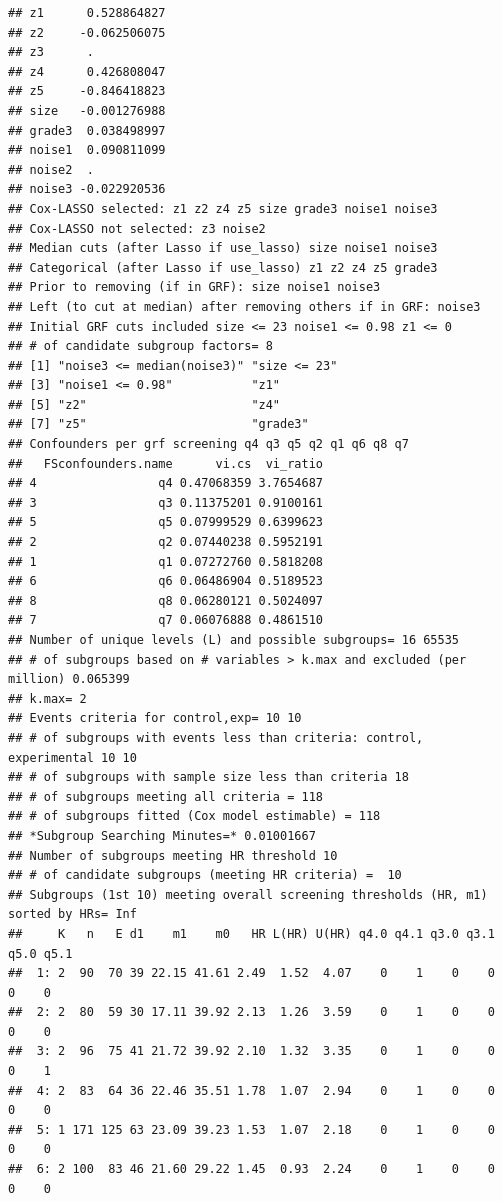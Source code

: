 \documentclass[smallextended]{svjour3}
\makeatletter
\newenvironment{kframe}{%
 \def\at@end@of@kframe{}%
 \ifinner\ifhmode%
  \def\at@end@of@kframe{\end{minipage}}%
  \begin{minipage}{\columnwidth}%
 \fi\fi%
 \def\FrameCommand##1{\hskip\@totalleftmargin \hskip-\fboxsep
 \colorbox{shadecolor}{##1}\hskip-\fboxsep
     \hskip-\linewidth \hskip-\@totalleftmargin \hskip\columnwidth}%
 \MakeFramed {\advance\hsize-\width
   \@totalleftmargin\z@ \linewidth\hsize
   \@setminipage}}%
 {\par\unskip\endMakeFramed%
 \at@end@of@kframe}
\newenvironment{knitrout}{}{} %
\makeatother
\begin{document}
\begin{knitrout}
\begin{kframe}
\begin{verbatim}
## z1      0.528864827
## z2     -0.062506075
## z3      .          
## z4      0.426808047
## z5     -0.846418823
## size   -0.001276988
## grade3  0.038498997
## noise1  0.090811099
## noise2  .          
## noise3 -0.022920536
## Cox-LASSO selected: z1 z2 z4 z5 size grade3 noise1 noise3 
## Cox-LASSO not selected: z3 noise2 
## Median cuts (after Lasso if use_lasso) size noise1 noise3 
## Categorical (after Lasso if use_lasso) z1 z2 z4 z5 grade3 
## Prior to removing (if in GRF): size noise1 noise3 
## Left (to cut at median) after removing others if in GRF: noise3 
## Initial GRF cuts included size <= 23 noise1 <= 0.98 z1 <= 0 
## # of candidate subgroup factors= 8 
## [1] "noise3 <= median(noise3)" "size <= 23"              
## [3] "noise1 <= 0.98"           "z1"                      
## [5] "z2"                       "z4"                      
## [7] "z5"                       "grade3"                  
## Confounders per grf screening q4 q3 q5 q2 q1 q6 q8 q7 
##   FSconfounders.name      vi.cs  vi_ratio
## 4                 q4 0.47068359 3.7654687
## 3                 q3 0.11375201 0.9100161
## 5                 q5 0.07999529 0.6399623
## 2                 q2 0.07440238 0.5952191
## 1                 q1 0.07272760 0.5818208
## 6                 q6 0.06486904 0.5189523
## 8                 q8 0.06280121 0.5024097
## 7                 q7 0.06076888 0.4861510
## Number of unique levels (L) and possible subgroups= 16 65535 
## # of subgroups based on # variables > k.max and excluded (per million) 0.065399 
## k.max= 2 
## Events criteria for control,exp= 10 10 
## # of subgroups with events less than criteria: control, experimental 10 10 
## # of subgroups with sample size less than criteria 18 
## # of subgroups meeting all criteria = 118 
## # of subgroups fitted (Cox model estimable) = 118 
## *Subgroup Searching Minutes=* 0.01001667 
## Number of subgroups meeting HR threshold 10 
## # of candidate subgroups (meeting HR criteria) =  10 
## Subgroups (1st 10) meeting overall screening thresholds (HR, m1) sorted by HRs= Inf 
##     K   n   E d1    m1    m0   HR L(HR) U(HR) q4.0 q4.1 q3.0 q3.1 q5.0 q5.1
##  1: 2  90  70 39 22.15 41.61 2.49  1.52  4.07    0    1    0    0    0    0
##  2: 2  80  59 30 17.11 39.92 2.13  1.26  3.59    0    1    0    0    0    0
##  3: 2  96  75 41 21.72 39.92 2.10  1.32  3.35    0    1    0    0    0    1
##  4: 2  83  64 36 22.46 35.51 1.78  1.07  2.94    0    1    0    0    0    0
##  5: 1 171 125 63 23.09 39.23 1.53  1.07  2.18    0    1    0    0    0    0
##  6: 2 100  83 46 21.60 29.22 1.45  0.93  2.24    0    1    0    0    0    0

\end{verbatim}
\end{kframe}
\end{knitrout}
\end{document}
